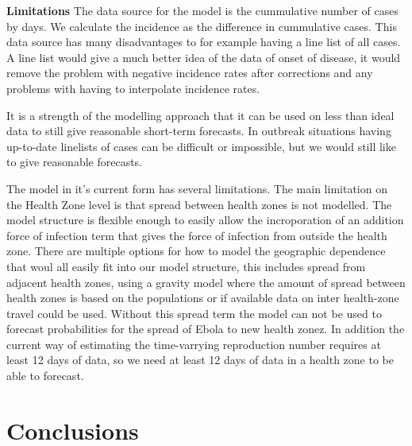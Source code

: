 \documentclass[12pt]{article}
\begin{document}
{\bf Limitations}
The data source for the model is the cummulative number of cases by days. We calculate the incidence as the difference in cummulative cases. This data source has many disadvantages to for example having a line list of all cases. A line list would give a much better idea of the data of onset of disease, it would remove the problem with negative incidence rates after corrections and any problems with having to interpolate incidence rates.

It is a strength of the modelling approach that it can be used on less than ideal data to still give reasonable short-term forecasts. In outbreak situations having up-to-date linelists of cases can be difficult or impossible, but we would still like to give reasonable forecasts. 

The model in it's current form has several limitations. The main limitation on the Health Zone level is that spread between health zones is not modelled. The model structure is flexible enough to easily allow the incroporation of an addition force of infection term that gives the force of infection from outside the health zone. There are multiple options for how to model the geographic dependence that woul all easily fit into our model structure, this includes spread from adjacent health zones, using a gravity model where the amount of spread between health zones is based on the populations or if available data on inter health-zone travel could be used. Without this spread term the model can not be used to forecast probabilities for the spread of Ebola to new health zonez. In addition the current way of estimating the time-varrying reproduction number requires at least 12 days of data, so we need at least 12 days of data in a health zone to be able to forecast.








\section{Conclusions}

\newpage

 

\end{document}
